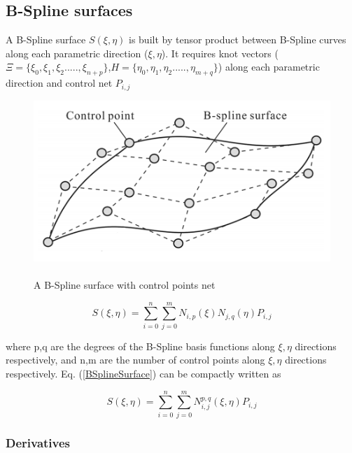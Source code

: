 \documentclass[11pt]{article}
\begin{document}
\subsection{B-Spline surfaces}
A B-Spline surface $S(\xi,\eta)$ is built by tensor product between B-Spline
curves along each parametric direction ($\xi,\eta$). It requires knot vectors
($\Xi = \{ \xi_0,\xi_1,\xi_2.....,\xi_{n+p}\}$,$H =
\{\eta_0,\eta_1,\eta_2.....,\eta_{m+q}\}$) along each parametric direction and
control net $P_{i,j}$
\begin{figure}[H]
	\begin{center}
		\includegraphics[scale=0.7]{B_Spline_Surface.png} 
		\caption{\\A B-Spline surface with control points net \cite{siggel2017tigl}}\label{B_Spline_Surface}
	\end{center}	
\end{figure}


\begin{equation} \label{BSplineSurface}
S(\xi,\eta) = \sum_{i=0}^{n}\sum_{j=0}^{m} N_{i,p}(\xi) N_{j,q}(\eta) P_{i,j}
\end{equation}

\noindent
where p,q are the degrees of the B-Spline basis functions along $\xi,\eta$ directions respectively, and n,m are the number of control points along $\xi,\eta$ directions respectively.
\noindent
Eq. (\ref{BSplineSurface}) can be compactly written as


\begin{equation} \label{BSplineSurface}
S(\xi,\eta) = \sum_{i=0}^{n}\sum_{j=0}^{m} N_{i,j}^{p,q}(\xi,\eta) P_{i,j}
\end{equation}

\subsubsection{Derivatives}
\end{document}
